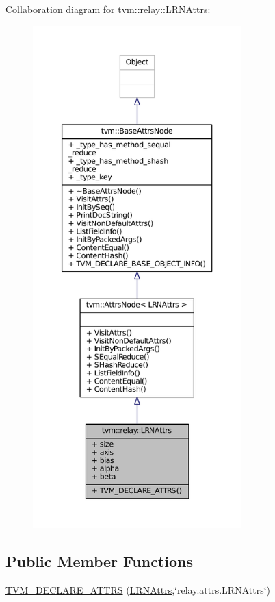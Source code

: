 Collaboration diagram for tvm\+:\+:relay\+:\+:L\+R\+N\+Attrs\+:
\nopagebreak
\begin{figure}[H]
\begin{center}
\leavevmode
\includegraphics[height=550pt]{structtvm_1_1relay_1_1LRNAttrs__coll__graph}
\end{center}
\end{figure}
\subsection*{Public Member Functions}
\begin{DoxyCompactItemize}
\item 
\hyperlink{structtvm_1_1relay_1_1LRNAttrs_aa7699e1110c5b05cc1f4f80cc8b94b38}{T\+V\+M\+\_\+\+D\+E\+C\+L\+A\+R\+E\+\_\+\+A\+T\+T\+RS} (\hyperlink{structtvm_1_1relay_1_1LRNAttrs}{L\+R\+N\+Attrs},\char`\"{}relay.\+attrs.\+L\+R\+N\+Attrs\char`\"{})
\end{DoxyCompactItemize}
